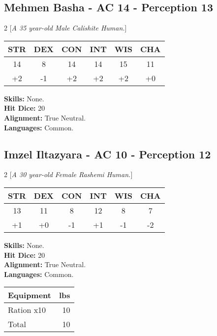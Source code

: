 \subsection*{Mehmen Basha - AC 14 - Perception 13}
\begin{multicols}{2}
[\textit{A 35 year-old Male Calishite Human.}]
\begin{tabular}{cccccc}
 {STR}&
 {DEX}&
 {CON}&
 {INT}&
 {WIS}&
 {CHA}\\
\hline
14 & 8 & 14 & 14 & 15 & 11\\
+2 & -1 & +2 & +2 & +2 & +0
\end{tabular}
\textbf{Skills:} 
None.\\
\textbf{Hit Dice:} 20\\
\textbf{Alignment:} True Neutral.\\
\textbf{Languages:} 
Common.\\


\end{multicols}


\subsection*{Imzel Iltazyara - AC 10 - Perception 12}
\begin{multicols}{2}
[\textit{A 30 year-old Female Rashemi Human.}]
\begin{tabular}{cccccc}
 {STR}&
 {DEX}&
 {CON}&
 {INT}&
 {WIS}&
 {CHA}\\
\hline
13 & 11 & 8 & 12 & 8 & 7\\
+1 & +0 & -1 & +1 & -1 & -2
\end{tabular}
\textbf{Skills:} 
None.\\
\textbf{Hit Dice:} 20\\
\textbf{Alignment:} True Neutral.\\
\textbf{Languages:} 
Common.\\

\begin{tabular}{p{} r}
\textbf{Equipment} & lbs\\
\hline

Ration x10 & 10\\

\hline
Total & 10
\end{tabular}


\end{multicols}


